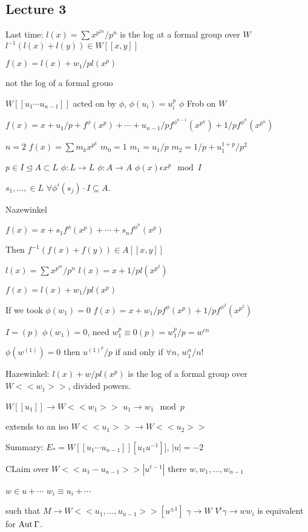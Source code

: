 \newpage
\subsection{Lecture 3}

Last time: $l(x)= \sum x^{p^{2n}}/p^n$
is the log at a formal group over $W$
$l^{-1}(l(x)+l(y)) \in W[[x,y]]$

$f(x)= l(x) + w_1/p l(x^p)$

not the log of a formal grouo


$W[[u_1\cdots u_{n-1}]]$
acted on by $\phi$, $\phi(u_i)= u_i^p$
$\phi$ Frob on $W$

$f(x)= x + u_1/p + f^\phi(x^p) + \cdots + u_{n-1}/p f^{\phi^{n-1}}(x^{p^n}) + 1/p f^{\phi^n}(x^{p^n})$

$n=2$
$f(x)= \sum m_k x^{p^k}$
$m_0=1$
$m_1= u_1/p$
$m_2= 1/p+ u_1^{1+p}/p^2$


$p \in I \unlhd A \subset L$
$\phi: L \to L$
$\phi: A \to A$
$\phi(x) \epsilon x^p \mod I$

$s_1,\ldots, \in L$
$\forall \phi^i(s_j) \cdot I \subseteq A$. 


Nazewinkel

$f(x)= x + s_1 f^\phi(x^p) + \cdots + s_n f^{\phi^n}(x^{p})$

Then $f^{-1}(f(x) + f(y)) \in A[[x,y]]$

$l(x)= \sum x^{p^m}/p^n$
$l(x)= x + 1/p l(x^{p^2})$

$f(x)= l(x) + w_1/p l(x^p)$

If we took $\phi(w_1)=0$
$f(x)= x + w_1/p f^\phi(x^p) + 1/p f^{\phi^2}(x^{p^2})$

$I=(p)$
$\phi(w_1)=0$, need $w_1^p \equiv 0(p)= w_1^p/p = w^{cn}$

$\phi(w^{(1)})=0$
then $u^{(1)^p}/p$ if and only if $\forall n$, $w_1^n/n!$

Hazewinkel: $l(x) + w/p l(x^p)$
is the log of a formal group over $W <<w_1>>$, divided powers. 


$W[[u_1]] \to W<<w_1>>$
$u_1 \to w_1 \mod p$

extends to an iso
$W<<u_1>> \to W<<u_2>>$

Summary: 
$E_*= W[[u_1\cdots u_{n-1}]][u_1u^{-1}]]$, $|u|= -2$

CLaim over $W<<u_1-u_{n-1}>>|u^{t-1}|$
there $w,w_1,\ldots,w_{n-1}$

$w \in u + \cdots$
$w_i \equiv u_i + \cdots$

such that $M \to W<<u_1,\ldots,u_{n-1}>>[u^{\pm 1}]$
$\gamma \to W$
$V^i\gamma \to ww_i$
is equivalent for $\operatorname{Aut} \Gamma$.

